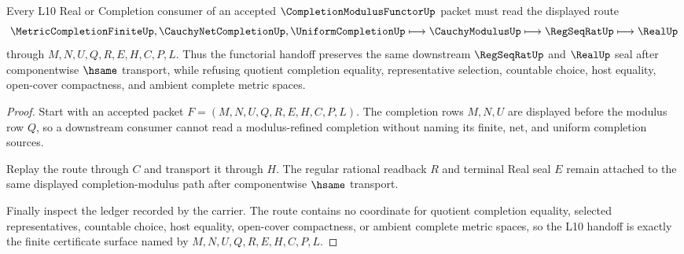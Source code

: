 \begin{theorem}
\label{thm:completion-modulus-functor-l10-handoff}
Every L10 Real or Completion consumer of an accepted $\CompletionModulusFunctorUp$ packet must read the displayed route
$$
\MetricCompletionFiniteUp,\CauchyNetCompletionUp,\UniformCompletionUp \longmapsto \CauchyModulusUp \longmapsto \RegSeqRatUp \longmapsto \RealUp
$$
through $M,N,U,Q,R,E,H,C,P,L$. Thus the functorial handoff preserves the same downstream $\RegSeqRatUp$ and $\RealUp$ seal after componentwise $\hsame$ transport, while refusing quotient completion equality, representative selection, countable choice, host equality, open-cover compactness, and ambient complete metric spaces.
\end{theorem}
\begin{proof}
Start with an accepted packet $F=(M,N,U,Q,R,E,H,C,P,L)$. The completion rows $M,N,U$ are displayed before the modulus row $Q$, so a downstream consumer cannot read a modulus-refined completion without naming its finite, net, and uniform completion sources.

Replay the route through $C$ and transport it through $H$. The regular rational readback $R$ and terminal Real seal $E$ remain attached to the same displayed completion-modulus path after componentwise $\hsame$ transport.

Finally inspect the ledger recorded by the carrier. The route contains no coordinate for quotient completion equality, selected representatives, countable choice, host equality, open-cover compactness, or ambient complete metric spaces, so the L10 handoff is exactly the finite certificate surface named by $M,N,U,Q,R,E,H,C,P,L$.
\end{proof}


\begin{closurestatus}{\CompletionModulusFunctorUp}
  \theoryclosure{\seedClosure}
  \formalstatus{\unformalizedV}
\end{closurestatus}
